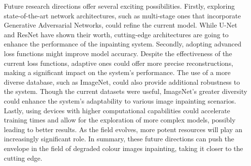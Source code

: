 Future research directions offer several exciting possibilities. Firstly, exploring state-of-the-art network architectures, such as multi-stage ones that incorporate Generative Adversarial Networks, could refine the current model. While U-Net and ResNet have shown their worth, cutting-edge architectures are going to enhance the performance of the inpainting system. Secondly, adopting advanced loss functions might improve model accuracy. Despite the effectiveness of the current loss functions, adaptive ones could offer more precise reconstructions, making a significant impact on the system's performance. The use of a more diverse database, such as ImageNet, could also provide additional robustness to the system. Though the current datasets were useful, ImageNet's greater diversity could enhance the system's adaptability to various image inpainting scenarios. Lastly, using devices with higher computational capabilities could accelerate training times and allow for the exploration of more complex models, possibly leading to better results. As the field evolves, more potent resources will play an increasingly significant role. In summary, these future directions can push the envelope in the field of degraded colour images inpainting, taking it closer to the cutting edge.
